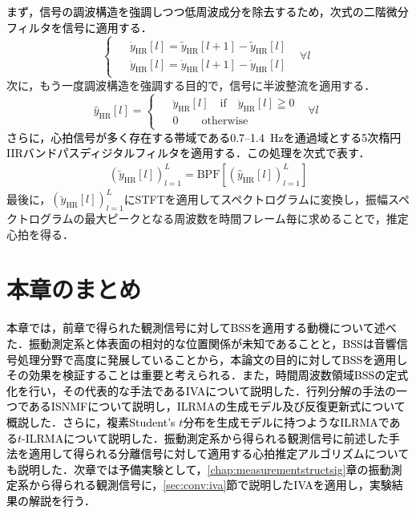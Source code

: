 \textcolor{black}{まず，信号の調波構造を強調しつつ低周波成分を除去するため，次式の二階微分フィルタを信号に適用する．}
\begin{equation} 
    \begin{cases}
        \begin{split}
        & \dot{y}_\mathrm{HR}[l]=\tilde{y}_\mathrm{HR}[l+1]-\tilde{y}_\mathrm{HR}[l] \\
        & \ddot{y}_\mathrm{HR}[l]=\dot{y}_\mathrm{HR}[l+1]-\dot{y}_\mathrm{HR}[l]
        \end{split}                         &   \forall{l}
    \end{cases}
\end{equation}
次に，もう一度調波構造を強調する目的で，信号に半波整流を適用する．
\begin{equation} 
\hat{y}_{\mathrm{HR}}[l] =
    \begin{cases}
        \begin{split}
        & \ddot{y}_\mathrm{HR}[l]\quad \mathrm{if}\quad \ddot{y}_\mathrm{HR}[l]\geqq0 \\
        & 0\hspace{25pt} \mathrm{otherwise}
        \end{split}                         &   \forall{l}
    \end{cases}
\end{equation}
\textcolor{black}{さらに，心拍信号が多く存在する帯域である0.7--1.4~Hzを通過域とする5次楕円IIRバンドパスディジタルフィルタを適用する．この処理を次式で表す．}
\begin{align}
    \left(\breve{y}_{\mathrm{HR}}[l]\right)_{l=1}^{L}=\mathrm{BPF}\left[\left(\hat{y}_{\mathrm{HR}}[l]\right)_{l=1}^{L}\right]
\end{align} \label{eq:bpf}
最後に，$( \breve{y}_{\mathrm{HR}}[l] )_{l=1}^L$にSTFTを適用してスペクトログラムに変換し，振幅スペクトログラムの最大ピークとなる周波数を時間フレーム毎に求めることで，推定心拍を得る．

\section{本章のまとめ}
\label{sec:conv:conclusion3}
\textcolor{black}{本章では，前章で得られた観測信号に対してBSSを適用する動機について述べた．振動測定系と体表面の相対的な位置関係が未知であることと，BSSは音響信号処理分野で高度に発展していることから，本論文の目的に対してBSSを適用しその効果を検証することは重要と考えられる．また，時間周波数領域BSSの定式化を行い，その代表的な手法であるIVAについて説明した．行列分解の手法の一つであるISNMFについて説明し，ILRMAの生成モデル及び反復更新式について概説した．さらに，複素Student's $t$分布を生成モデルに持つようなILRMAである$t$-ILRMAについて説明した．振動測定系から得られる観測信号に前述した手法を適用して得られる分離信号に対して適用する心拍推定アルゴリズムについても説明した．次章では予備実験として，\ref{chap:measurementstructsig}章の振動測定系から得られる観測信号に，\ref{sec:conv:iva}節で説明したIVAを適用し，実験結果の解説を行う．}

